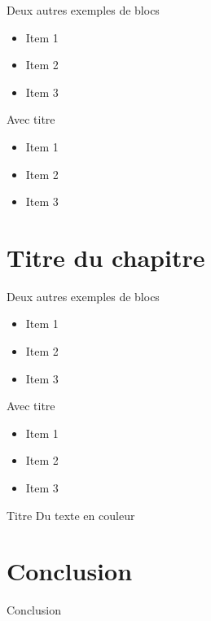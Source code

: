 \documentclass[slideopt,A4,showboxes,svgnames]{beamer}
\begin{document}
\begin{frame}{Deux autres exemples de blocs}
    \begin{alertblock}{}
 \begin{itemize}
    \item{Item 1 }
    \item {Item 2}
    \item {Item 3}
    \end{itemize}
  \end{alertblock}
      \begin{alertblock}{Avec titre}
 \begin{itemize}
    \item{Item 1 }
    \item {Item 2}
    \item {Item 3}
    \end{itemize}
  \end{alertblock}
\end{frame}

\section{Titre du chapitre}
 \frame{\sectionpage}

\begin{frame}{Deux autres exemples de blocs}
    \begin{exampleblock}{}
 \begin{itemize}
    \item{Item 1 }
    \item {Item 2}
    \item {Item 3}
    \end{itemize}
  \end{exampleblock}
      \begin{exampleblock}{Avec titre}
 \begin{itemize}
    \item{Item 1 }
    \item {Item 2}
    \item {Item 3}
    \end{itemize}
  \end{exampleblock}
\end{frame}
\begin{frame}{Titre}
Du \textcolor{gris_fonce_inria}{texte}  {en}  \textcolor{rouge_inria}{couleur} 
\end{frame}
\section{Conclusion}
\begin{frame}{Conclusion}
 
\end{frame}
\end{document}
